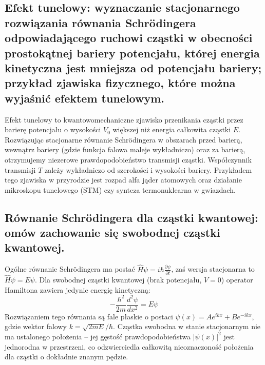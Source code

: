 \documentclass[11pt,a4paper]{article}
\begin{document}
\subsection{Efekt tunelowy: wyznaczanie stacjonarnego rozwiązania równania Schrödingera odpowiadającego ruchowi cząstki w obecności prostokątnej bariery potencjału, której energia kinetyczna jest mniejsza od potencjału bariery; przykład zjawiska fizycznego, które można wyjaśnić efektem tunelowym.}
Efekt tunelowy to kwantowomechaniczne zjawisko przenikania cząstki przez barierę potencjału o wysokości $V_0$ większej niż energia całkowita cząstki $E$. Rozwiązując stacjonarne równanie Schrödingera w obszarach przed barierą, wewnątrz bariery (gdzie funkcja falowa maleje wykładniczo) oraz za barierą, otrzymujemy niezerowe prawdopodobieństwo transmisji cząstki. Współczynnik transmisji $T$ zależy wykładniczo od szerokości i wysokości bariery. Przykładem tego zjawiska w przyrodzie jest rozpad alfa jąder atomowych oraz działanie mikroskopu tunelowego (STM) czy synteza termonuklearna w gwiazdach.

\subsection{Równanie Schrödingera dla cząstki kwantowej: omów zachowanie się swobodnej cząstki kwantowej.}
Ogólne równanie Schrödingera ma postać $\hat{H}\psi = i\hbar \frac{\partial \psi}{\partial t}$, zaś wersja stacjonarna to $\hat{H}\psi = E\psi$. Dla swobodnej cząstki kwantowej (brak potencjału, $V = 0$) operator Hamiltona zawiera jedynie energię kinetyczną:
\begin{equation}
-\frac{\hbar^2}{2m} \frac{d^2\psi}{dx^2} = E\psi
\end{equation}
Rozwiązaniem tego równania są fale płaskie o postaci $\psi(x) = A e^{ikx} + B e^{-ikx}$, gdzie wektor falowy $k = \sqrt{2mE}/\hbar$. Cząstka swobodna w stanie stacjonarnym nie ma ustalonego położenia -- jej gęstość prawdopodobieństwa $|\psi(x)|^2$ jest jednorodna w przestrzeni, co odzwierciedla całkowitą nieoznaczoność położenia dla cząstki o dokładnie znanym pędzie.
\end{document}
